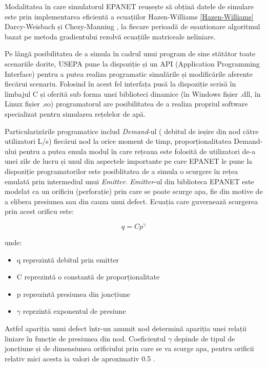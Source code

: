 Modalitatea în care simulatorul EPANET reușește să obțină datele de simulare este prin implementarea eficientă a ecuațiilor  Hazen-Williams \eqref{Hazen-Williams} Darcy-Weisbach și Chezy-Manning \cite{rossman2000epanet} \cite{rossman1999epanet}, la fiecare perioadă de eșantionare algoritmul bazat pe metoda gradientului rezolvă ecuațiile matriceale neliniare.

Pe lângă posibilitatea de a simula în cadrul unui program de sine stătător toate scenariile dorite, USEPA pune la dispoziție și un API (Application Programming Interface) pentru a putea realiza programatic simulările și modificările aferente fiecărui scenariu. Folosind în acest fel interfața pusă la dispoziție scrisă în limbajul C și oferită sub forma unei biblioteci dinamice (în Windows fișier .dll, în Linux fișier .so) programatorul are posibilitatea de a realiza propriul software specializat pentru simularea rețelelor de apă. 

Particularizările programatice includ \emph{Demand}-ul ( debitul de ieșire din nod către utilizatori L/s) fiecărui nod la orice moment de timp, proporționalitatea Demand-ului pentru a putea emula modul în care rețeaua este folosită de utilizatori de-a unei zile de lucru și unul din aspectele importante pe care EPANET le pune la dispoziție programatorilor este posiblitatea de a simula o scurgere în rețea emulată prin intermediul unui \emph{Emitter}. \emph{Emitter}-ul din biblioteca EPANET este modelat ca un orificiu (perforație) prin care se poate scurge apa, fie din motive de a elibera presiunea sau din cauza unui defect. Ecuația care guvernează scurgerea prin acest orificu este:

\begin{equation}
\label{eq:emitter}
    q = Cp^\gamma
\end{equation}

unde:
\begin{itemize}
    \item q reprezintă debitul prin emitter
    \item C reprezintă o constantă de proporționalitate
    \item p reprezintă presiunea din joncțiune
    \item $\gamma$ reprzintă exponentul de presiune
\end{itemize}

Astfel apariția unui defect într-un anumit nod determină apariția unei relații liniare în funcție de presiunea din nod. Coeficientul $\gamma$ depinde de tipul de joncțiune și de dimensiunea orificiului prin care se va scurge apa, pentru orificii relativ mici acesta ia valori de aproximativ 0.5 \cite{rossman2000epanet}.

